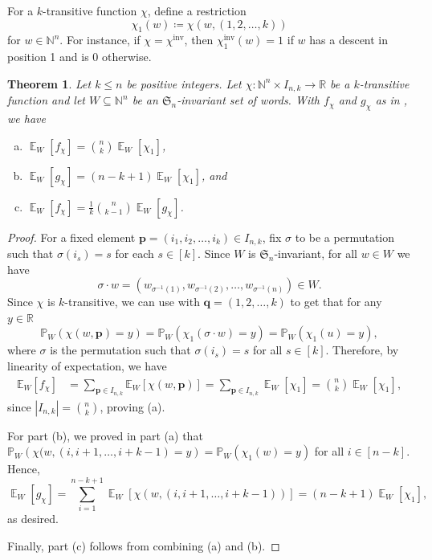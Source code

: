 \documentclass{amsart}
\newcommand{\N}{\mathbb{N}}
\renewcommand{\P}{\mathbb{P}}
\newcommand{\R}{\mathbb{R}}
\renewcommand{\S}{\mathfrak{S}}
\DeclareMathOperator{\inv}{inv}
\DeclareMathOperator{\E}{\mathbb{E}}
\newcommand{\lp}{\left(}
\newcommand{\rp}{\right)}
\newcommand{\lb}{\left[}
\newcommand{\rb}{\right]}
\newtheorem{theorem}{Theorem}[section]
\theoremstyle{definition}
\begin{document}
For a $k$-transitive function $\chi$, define a restriction
\[\chi_1(w)\coloneqq\chi(w,(1,2,\dots,k))\]
for $w\in \N^n$. For instance, if $\chi=\chi^{\inv}$, then $\chi^{\inv}_1(w)=1$ if $w$ has a descent in position 1 and is 0 otherwise.

\begin{theorem}\label{thm:k-transitive-sn-invariant-inv-and-sum}
    Let $k\leq n$ be positive integers.
    Let $\chi:\N^n\times I_{n,k}\to \R$ be a $k$-transitive function and let $W\subseteq \N^n$ be an $\S_n$-invariant set of words. With $f_{\chi}$ and $g_{\chi}$ as in , we have
\begin{enumerate}[(a)]
    \item $\E_W[f_\chi]=\binom{n}{k}\E_W[\chi_1]$,
    \item $\E_W[g_\chi]=(n-k+1)\E_W[\chi_1]$, and
    \item $\E_W[f_\chi]=\frac{1}{k}\binom{n}{k-1}\E_W[g_\chi]$.
\end{enumerate}
\end{theorem}

\begin{proof}
    For a fixed element $\textbf{p}=(i_1,i_2,\dots,i_k)\in I_{n,k}$, fix $\sigma$ to be a permutation such that $\sigma(i_s)=s$ for each $s\in [k]$. Since $W$ is $\S_n$-invariant, for all $w\in W$ we have
    \[\sigma\cdot w=(w_{\sigma^{-1}(1)},w_{\sigma^{-1}(2)},\dots,w_{\sigma^{-1}(n)})\in W.\]
     Since $\chi$ is $k$-transitive, we can use   with $\textbf{q}=(1,2,\dots,k)$ to get that for any $y\in \R$
    \[\P_W(\chi(w,\textbf{p})=y)=\P_W(\chi_1(\sigma \cdot w)=y)=\P_W(\chi_1(u)=y),\]
    where $\sigma$ is the permutation such that $\sigma(i_s)=s$ for all $s\in [k]$.
    Therefore, by linearity of expectation, we have 
    \begin{align}\label{eq:E(inv)1}
        \mathbb{E}_{W}\lb f_\chi\rb &=\sum_{\textbf{p}\in I_{n,k}}\mathbb{E}_{W}\lb \chi(w,\textbf{p})\rb=\sum_{\textbf{p}\in I_{n,k}}\E_W[\chi_1]=\binom{n}{k}\E_W[\chi_1],
    \end{align}
    since $|I_{n,k}|=\binom{n}{k}$, proving (a).
 

       
   For part (b), we proved in part (a) that $\P_W\lp \chi(w,(i,i+1,\dots,i+k-1)=y\rp=\P_W\lp \chi_1(w)=y\rp$ for all $i\in [n-k]$. 
   Hence, 
    \begin{equation*}\label{eq:E(des)1}
    \E_W\lb g_\chi\rb=\sum_{i=1}^{n-k+1}\E_W\lb 
    \chi(w, (i,i+1,\dots,i+k-1))\rb=(n-k+1)\E_W[\chi_1],
    \end{equation*}
    as desired.

    Finally, part (c) follows from combining (a) and (b).
\end{proof}
\end{document}
